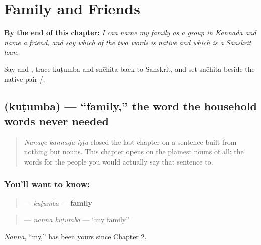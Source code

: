 
\chapter{Family and Friends}
\label{ch:ka-family-and-friends}

\begin{chapteropening}
\textbf{By the end of this chapter:} \emph{I can name my family as a group in Kannada and name a friend, and say which of the two words is native and which is a Sanskrit loan.}

Say    and   , trace kuṭumba and snēhita back to Sanskrit, and set snēhita beside the native pair /.
\end{chapteropening}

\section[\texorpdfstring{\kn{ಕುಟುಂಬ} (kuṭumba)}{ಕುಟುಂಬ (kuṭumba)}]{ (kuṭumba) — \textquotedblleft{}family,\textquotedblright{} the word the household words never needed}

\label{lesson:KA-C35-kutumba}



\begin{quote}
\emph{Nanage kannaḍa iṣṭa} closed the last chapter on a sentence built from nothing but nouns. This chapter opens on the plainest nouns of all: the words for the people you would actually say that sentence to.
\end{quote}

\subsection*{You'll want to know: }
\begin{quote}
\textbf{} — \emph{kuṭumba} — \textbf{family}
\end{quote}

\begin{quote}
\textbf{ } — \emph{nanna kuṭumba} — \textquotedblleft{}my family\textquotedblright{}
\end{quote}

\emph{Nanna}, \textquotedblleft{}my,\textquotedblright{} has been yours since Chapter 2.


